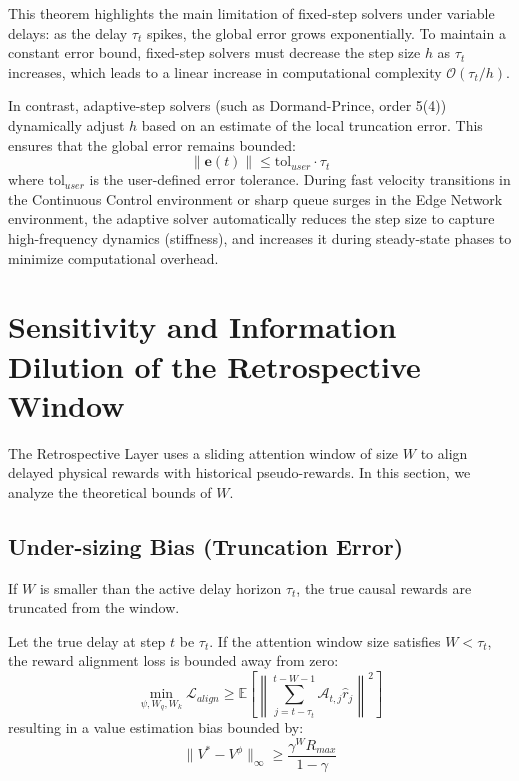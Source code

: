 \documentclass[manuscript, screen, review]{jair}
\begin{document}
This theorem highlights the main limitation of fixed-step solvers under variable delays: as the delay $\tau_t$ spikes, the global error grows exponentially. To maintain a constant error bound, fixed-step solvers must decrease the step size $h$ as $\tau_t$ increases, which leads to a linear increase in computational complexity $\mathcal{O}(\tau_t / h)$.

In contrast, adaptive-step solvers (such as Dormand-Prince, order 5(4)) dynamically adjust $h$ based on an estimate of the local truncation error. This ensures that the global error remains bounded:
\begin{equation}
    \| \mathbf{e}(t) \| \le \text{tol}_{user} \cdot \tau_t
\end{equation}
where $\text{tol}_{user}$ is the user-defined error tolerance. During fast velocity transitions in the Continuous Control environment or sharp queue surges in the Edge Network environment, the adaptive solver automatically reduces the step size to capture high-frequency dynamics (stiffness), and increases it during steady-state phases to minimize computational overhead.

\section{Sensitivity and Information Dilution of the Retrospective Window}\label{app:sec_retrospective_sensitivity}
The Retrospective Layer uses a sliding attention window of size $W$ to align delayed physical rewards with historical pseudo-rewards. In this section, we analyze the theoretical bounds of $W$.

\subsection{Under-sizing Bias (Truncation Error)}\label{app:sub_undersizing}
If $W$ is smaller than the active delay horizon $\tau_t$, the true causal rewards are truncated from the window.

\begin{theorem}
Let the true delay at step $t$ be $\tau_t$. If the attention window size satisfies $W < \tau_t$, the reward alignment loss is bounded away from zero:
\begin{equation}
    \min_{\psi, W_q, W_k} \mathcal{L}_{align} \ge \mathbb{E} \left[ \left\| \sum_{j=t-\tau_t}^{t-W-1} \mathcal{A}_{t, j} \hat{r}_j \right\|^2 \right]
\end{equation}
resulting in a value estimation bias bounded by:
\begin{equation}
    \| V^* - V^\phi \|_\infty \ge \frac{\gamma^W R_{max}}{1-\gamma}
\end{equation}
\end{theorem}
\end{document}
